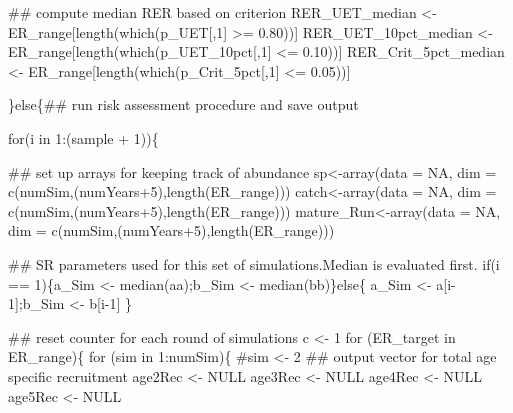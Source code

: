 \documentclass[
  11pt,
]{article}
\newenvironment{Shaded}{}{}
\newcommand{\CommentTok}[1]{\textcolor[rgb]{0.00,0.50,0.00}{#1}}
\newcommand{\ControlFlowTok}[1]{\textcolor[rgb]{0.00,0.00,1.00}{#1}}
\newcommand{\DataTypeTok}[1]{#1}
\newcommand{\DecValTok}[1]{#1}
\newcommand{\FloatTok}[1]{#1}
\newcommand{\KeywordTok}[1]{\textcolor[rgb]{0.00,0.00,1.00}{#1}}
\newcommand{\NormalTok}[1]{#1}
\newcommand{\OperatorTok}[1]{#1}
\newcommand{\OtherTok}[1]{\textcolor[rgb]{1.00,0.25,0.00}{#1}}
\newcommand{\StringTok}[1]{\textcolor[rgb]{0.00,0.50,0.50}{#1}}
\begin{document}
\begin{Shaded}
\begin{Highlighting}[]
  \CommentTok{## compute median RER based on criterion}
\NormalTok{  RER_UET_median <-}\StringTok{ }\NormalTok{ER_range[}\KeywordTok{length}\NormalTok{(}\KeywordTok{which}\NormalTok{(p_UET[,}\DecValTok{1}\NormalTok{] }\OperatorTok{>=}\StringTok{ }\FloatTok{0.80}\NormalTok{))]}
\NormalTok{  RER_UET_10pct_median <-}\StringTok{ }\NormalTok{ER_range[}\KeywordTok{length}\NormalTok{(}\KeywordTok{which}\NormalTok{(p_UET_10pct[,}\DecValTok{1}\NormalTok{] }\OperatorTok{<=}\StringTok{ }\FloatTok{0.10}\NormalTok{))]}
\NormalTok{  RER_Crit_5pct_median <-}\StringTok{ }\NormalTok{ER_range[}\KeywordTok{length}\NormalTok{(}\KeywordTok{which}\NormalTok{(p_Crit_5pct[,}\DecValTok{1}\NormalTok{] }\OperatorTok{<=}\StringTok{ }\FloatTok{0.05}\NormalTok{))]}
  
\NormalTok{\}}\ControlFlowTok{else}\NormalTok{\{}\CommentTok{## run risk assessment procedure and save output}
  
  \ControlFlowTok{for}\NormalTok{(i }\ControlFlowTok{in} \DecValTok{1}\OperatorTok{:}\NormalTok{(sample }\OperatorTok{+}\StringTok{ }\DecValTok{1}\NormalTok{))\{}
  
    \CommentTok{## set up arrays for keeping track of abundance}
\NormalTok{    sp<-}\KeywordTok{array}\NormalTok{(}\DataTypeTok{data =} \OtherTok{NA}\NormalTok{, }\DataTypeTok{dim =} \KeywordTok{c}\NormalTok{(numSim,(numYears}\OperatorTok{+}\DecValTok{5}\NormalTok{),}\KeywordTok{length}\NormalTok{(ER_range)))}
\NormalTok{    catch<-}\KeywordTok{array}\NormalTok{(}\DataTypeTok{data =} \OtherTok{NA}\NormalTok{, }\DataTypeTok{dim =} \KeywordTok{c}\NormalTok{(numSim,(numYears}\OperatorTok{+}\DecValTok{5}\NormalTok{),}\KeywordTok{length}\NormalTok{(ER_range)))}
\NormalTok{    mature_Run<-}\KeywordTok{array}\NormalTok{(}\DataTypeTok{data =} \OtherTok{NA}\NormalTok{, }\DataTypeTok{dim =} \KeywordTok{c}\NormalTok{(numSim,(numYears}\OperatorTok{+}\DecValTok{5}\NormalTok{),}\KeywordTok{length}\NormalTok{(ER_range)))}
    
    \CommentTok{## SR parameters used for this set of simulations.Median is evaluated first.}
    \ControlFlowTok{if}\NormalTok{(i }\OperatorTok{==}\StringTok{ }\DecValTok{1}\NormalTok{)\{a_Sim <-}\StringTok{ }\KeywordTok{median}\NormalTok{(aa);b_Sim <-}\StringTok{ }\KeywordTok{median}\NormalTok{(bb)\}}\ControlFlowTok{else}\NormalTok{\{}
\NormalTok{      a_Sim <-}\StringTok{ }\NormalTok{a[i}\DecValTok{-1}\NormalTok{];b_Sim <-}\StringTok{ }\NormalTok{b[i}\DecValTok{-1}\NormalTok{]}
\NormalTok{    \}}
    
    \CommentTok{## reset counter for each round of simulations}
\NormalTok{    c <-}\StringTok{ }\DecValTok{1}
    \ControlFlowTok{for}\NormalTok{ (ER_target }\ControlFlowTok{in}\NormalTok{ ER_range)\{}
      \ControlFlowTok{for}\NormalTok{ (sim }\ControlFlowTok{in} \DecValTok{1}\OperatorTok{:}\NormalTok{numSim)\{}
        \CommentTok{#sim <- 2}
        \CommentTok{## output vector for total age specific recruitment}
\NormalTok{        age2Rec <-}\StringTok{ }\OtherTok{NULL}
\NormalTok{        age3Rec <-}\StringTok{ }\OtherTok{NULL}
\NormalTok{        age4Rec <-}\StringTok{ }\OtherTok{NULL}
\NormalTok{        age5Rec <-}\StringTok{ }\OtherTok{NULL}
        

\end{Highlighting}
\end{Shaded}
\end{document}
